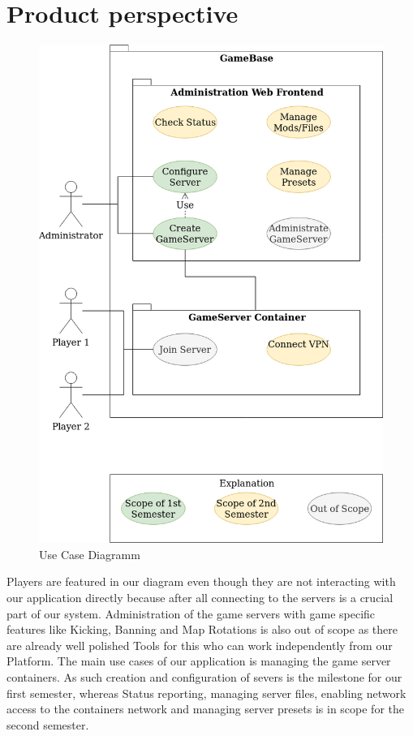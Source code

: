 \documentclass[a4paper,12pt,chapterprefix=false,bibliography=totoc,listof=totoc,]{scrreprt}
\begin{document}
\section{Product perspective}
\begin{figure}
	\includegraphics[width=\textwidth]{Use_Case_Diagramm.png}
	\caption{Use Case Diagramm}
	\label{fig:ucd}
\end{figure}
Players are featured in our diagram even though they are not interacting with our application directly because after all connecting to the servers is a crucial part of our system.
Administration of the game servers with game specific features like Kicking, Banning and Map Rotations is also out of scope as there are already well polished Tools for this who can work independently from our Platform.
The main use cases of our application is managing the game server containers.
As such creation and configuration of severs is the milestone for our first semester, whereas Status reporting, managing server files, enabling network access to the containers network and managing server presets is in scope for the second semester.
\end{document}
